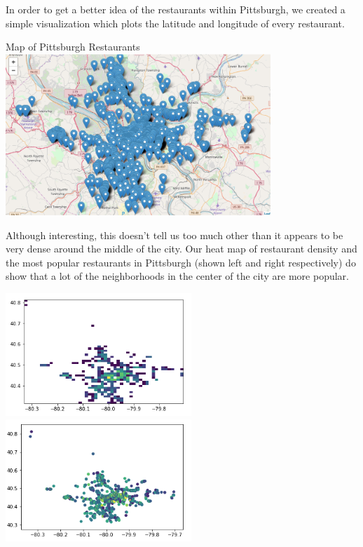 \documentclass{neu_handout}
\begin{document}
In order to get a better idea of the restaurants within Pittsburgh, we created a simple visualization which plots the latitude and longitude of every restaurant.

\begin{center}
Map of Pittsburgh Restaurants \\
\includegraphics[width=100mm,scale=0.5]{PittsburghRestaurants}\\
\end{center}

Although interesting, this doesn't tell us too much other than it appears to be very dense around the middle of the city. Our heat map of restaurant density and the most popular restaurants in Pittsburgh (shown left and right respectively) do show that a lot of the neighborhoods in the center of the city are more popular.

\begin{center}
\includegraphics[width=70mm,scale=0.5]{pa_rest_density}
\includegraphics[width=70mm,scale=0.5]{pa_popular_restaurants}
\end{center}
\end{document}
